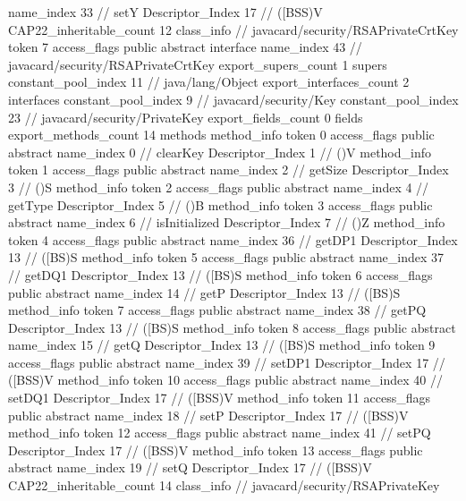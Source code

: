 {{{{{					name_index	33		// setY
					Descriptor_Index	17		// ([BSS)V
				}
			}
			CAP22_inheritable_count	12
		}
		class_info {		// javacard/security/RSAPrivateCrtKey
			token	7
			access_flags	public abstract interface
			name_index	43		// javacard/security/RSAPrivateCrtKey
			export_supers_count	1
			supers {
				constant_pool_index	11		// java/lang/Object
			}
			export_interfaces_count	2
			interfaces {
				constant_pool_index	9		// javacard/security/Key
				constant_pool_index	23		// javacard/security/PrivateKey
			}
			export_fields_count	0
			fields {
			}
			export_methods_count	14
			methods {
				method_info {
					token	0
					access_flags	public abstract
					name_index	0		// clearKey
					Descriptor_Index	1		// ()V
				}
				method_info {
					token	1
					access_flags	public abstract
					name_index	2		// getSize
					Descriptor_Index	3		// ()S
				}
				method_info {
					token	2
					access_flags	public abstract
					name_index	4		// getType
					Descriptor_Index	5		// ()B
				}
				method_info {
					token	3
					access_flags	public abstract
					name_index	6		// isInitialized
					Descriptor_Index	7		// ()Z
				}
				method_info {
					token	4
					access_flags	public abstract
					name_index	36		// getDP1
					Descriptor_Index	13		// ([BS)S
				}
				method_info {
					token	5
					access_flags	public abstract
					name_index	37		// getDQ1
					Descriptor_Index	13		// ([BS)S
				}
				method_info {
					token	6
					access_flags	public abstract
					name_index	14		// getP
					Descriptor_Index	13		// ([BS)S
				}
				method_info {
					token	7
					access_flags	public abstract
					name_index	38		// getPQ
					Descriptor_Index	13		// ([BS)S
				}
				method_info {
					token	8
					access_flags	public abstract
					name_index	15		// getQ
					Descriptor_Index	13		// ([BS)S
				}
				method_info {
					token	9
					access_flags	public abstract
					name_index	39		// setDP1
					Descriptor_Index	17		// ([BSS)V
				}
				method_info {
					token	10
					access_flags	public abstract
					name_index	40		// setDQ1
					Descriptor_Index	17		// ([BSS)V
				}
				method_info {
					token	11
					access_flags	public abstract
					name_index	18		// setP
					Descriptor_Index	17		// ([BSS)V
				}
				method_info {
					token	12
					access_flags	public abstract
					name_index	41		// setPQ
					Descriptor_Index	17		// ([BSS)V
				}
				method_info {
					token	13
					access_flags	public abstract
					name_index	19		// setQ
					Descriptor_Index	17		// ([BSS)V
				}
			}
			CAP22_inheritable_count	14
		}
		class_info {		// javacard/security/RSAPrivateKey
}}}

